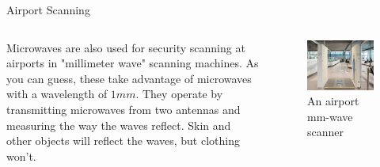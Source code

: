 \documentclass{beamer}
\begin{document}
\begin{frame}{Airport Scanning}
\begin{columns}
    \begin{column}{.5\textwidth}
        Microwaves are also used for security scanning at airports in "millimeter wave" scanning machines. As you can guess, these take advantage of microwaves with a wavelength of $1mm$. They operate by transmitting microwaves from two antennas and measuring the way the waves reflect. Skin and other objects will reflect the waves, but clothing won't.
    \end{column}
    \begin{column}{.5\textwidth}
    \begin{figure}
        \centering
        \includegraphics[scale=.12]{mmwavescan.jpg}
        \caption{An airport mm-wave scanner}
        \label{fig:mmwave}
    \end{figure}
    \end{column}
\end{columns}
    
\end{frame}
\end{document}
